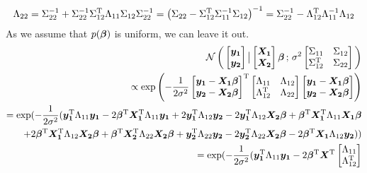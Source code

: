 \documentclass[twoside]{article}
\begin{document}
\begin{align*}
\Lambda_{22}=
\Sigma_{22}^{-1} +\Sigma_{22}^{-1}\Sigma_{12}^\mathrm{T}\Lambda_{11}\Sigma_{12}\Sigma_{22}^{-1}
=\left(\Sigma_{22} - \Sigma_{12}^\mathrm{T}\Sigma_{11}^{-1}\Sigma_{12}\right)^{-1}
=
\Sigma_{22}^{-1} - \Lambda_{12}^\mathrm{T}\Lambda_{11}^{-1}\Lambda_{12}
\end{align*}
As we assume that $p(\bm{\beta})$ is uniform, we can leave it out.
\begin{align*}
\mathcal{N}\left(\, { {
\begin{bmatrix}
\bm{y_1}\\
\bm{y_2}
\end{bmatrix}
} \, \big| \, {
\begin{bmatrix}
\bm{X_1}\\
\bm{X_2}
\end{bmatrix}    
\bm{\beta}
} } \,;\, { {
\sigma^2
\begin{bmatrix}
\Sigma_{11} & \Sigma_{12}\\
\Sigma_{12}^\mathrm{T} & \Sigma_{22} 
\end{bmatrix}
} } \,\right)
\\
\propto
\exp\left(-\frac{1}{2\sigma^2}
\begin{bmatrix}
\bm{y_1} - \bm{X_1}\bm{\beta}\\
\bm{y_2} - \bm{X_2}\bm{\beta}
\end{bmatrix}^\mathrm{T}
\begin{bmatrix}
\Lambda_{11} & \Lambda_{12}\\
\Lambda_{12}^\mathrm{T} & \Lambda_{22} 
\end{bmatrix}
\begin{bmatrix}
\bm{y_1} - \bm{X_1}\bm{\beta}\\
\bm{y_2} - \bm{X_2}\bm{\beta}
\end{bmatrix}
\right) 
\\=
\exp(
-\frac{1}{2\sigma^2}
(
\bm{y_1}^\mathrm{T} 
\Lambda_{11}
\bm{y_1} 
-
2
\bm{\beta}^\mathrm{T}\bm{X_1}^\mathrm{T} 
\Lambda_{11}
\bm{y_1} 
+
2
\bm{y_1}^\mathrm{T} 
\Lambda_{12}
\bm{y_2}
-
2
\bm{y_1}^\mathrm{T} 
\Lambda_{12}
\bm{X_2}\bm{\beta}
+
\bm{\beta}^\mathrm{T}\bm{X_1}^\mathrm{T} 
\Lambda_{11}
\bm{X_1}\bm{\beta}
\\+
2
\bm{\beta}^\mathrm{T}\bm{X_1}^\mathrm{T} 
\Lambda_{12}
\bm{X_2}\bm{\beta}
+
\bm{\beta}^\mathrm{T}\bm{X_2}^\mathrm{T} 
\Lambda_{22}
\bm{X_2}\bm{\beta}
+
\bm{y_2}^\mathrm{T} 
\Lambda_{22}
\bm{y_2}
-
2
\bm{y_2}^\mathrm{T} 
\Lambda_{22}
\bm{X_2}\bm{\beta}
-
2
\bm{\beta}^\mathrm{T}\bm{X_1}
\Lambda_{12}
\bm{y_2}
)
)
\\
=
\exp(
-\frac{1}{2\sigma^2}
(
\bm{y_1}^\mathrm{T} 
\Lambda_{11}
\bm{y_1} 
-
2
\bm{\beta}^\mathrm{T}\bm{X}^\mathrm{T} 
\begin{bmatrix}
\Lambda_{11} \\ \Lambda_{12}^\mathrm{T}

\end{bmatrix}
\end{align*}
\end{document}
